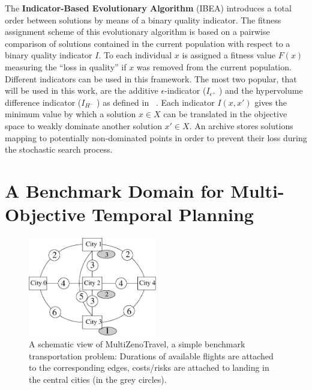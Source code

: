 \documentclass[a4paper,10pt]{article}
\def\MULTIZENO{{\sc MultiZenoTravel}}
\begin{document}
The {\bf Indicator-Based Evolutionary Algorithm} (IBEA) \cite{Zitzler2004}
introduces a total order between solutions by means of a binary quality indicator. 
The fitness assignment scheme of this evolutionary algorithm is based on a pairwise comparison of solutions contained 
in  the current population with respect to a binary quality indicator $I$. To each individual $x$ is assigned a fitness value $F (x)$ measuring the ``loss in quality'' if $x$ was removed from the current
population. Different indicators can be used in this framework. The most two popular, that will be used in this work, are the additive $\epsilon$-indicator ($I_{\epsilon^+}$ ) and the hypervolume
difference indicator ($I_{H^-}$ )  as defined in ~\cite{Zitzler2004}. 
Each indicator  $I (x, x')$ gives the minimum value by which a solution $x \in X$  can be translated in the objective space to weakly dominate
another solution $x' \in X$. 
An archive stores solutions mapping to potentially non-dominated points in order to prevent their loss during the stochastic search process.


\section{A Benchmark Domain for Multi-Objective Temporal Planning}
\label{benchmark}

\begin{figure}[tb!]
\begin{center}
 \includegraphics[width=0.5\textwidth]{./miniMulti.eps}
\caption{A schematic view of \MULTIZENO, a simple benchmark transportation problem: Durations of available flights are attached to the corresponding edges, costs/risks are attached to landing in the central cities (in the grey circles).}
\label{fig.instance}
\end{center}
\end{figure}
\end{document}

